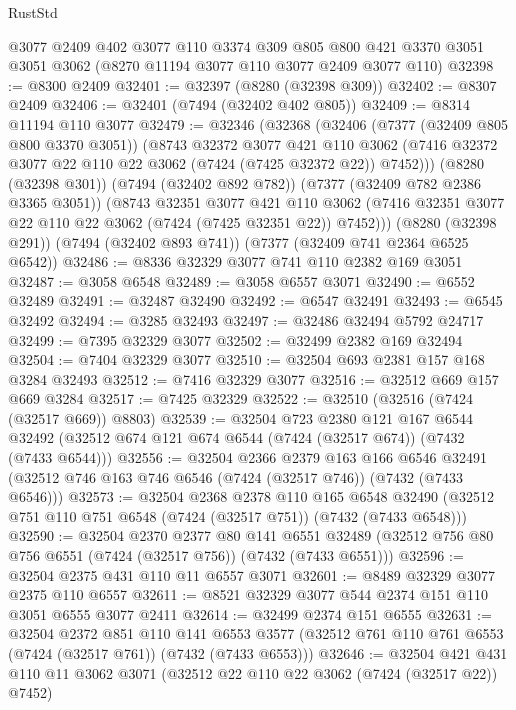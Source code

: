 \begin{lexlean}{RustStd}
\begin{coremodule}
    @3077
    @2409
    @402
    @3077
    @110
    @3374
    @309
    @805
    @800
    @421
    @3370
    @3051
    @3051
    @3062
    (@8270 @11194 @3077 @110 @3077 @2409 @3077 @110)
@32398 := @8300 @2409
@32401 := @32397 (@8280 (@32398 @309))
@32402 := @8307 @2409
@32406 := @32401 (@7494 (@32402 @402 @805))
@32409 := @8314 @11194 @110 @3077
@32479 := @32346
    (@32368
      (@32406
        (@7377 (@32409 @805 @800 @3370 @3051))
        (@8743
          @32372
          @3077
          @421
          @110
          @3062
          (@7416 @32372 @3077 @22 @110 @22 @3062 (@7424 (@7425 @32372 @22)) @7452)))
      (@8280 (@32398 @301))
      (@7494 (@32402 @892 @782))
      (@7377 (@32409 @782 @2386 @3365 @3051))
      (@8743
        @32351
        @3077
        @421
        @110
        @3062
        (@7416 @32351 @3077 @22 @110 @22 @3062 (@7424 (@7425 @32351 @22)) @7452)))
    (@8280 (@32398 @291))
    (@7494 (@32402 @893 @741))
    (@7377 (@32409 @741 @2364 @6525 @6542))
@32486 := @8336 @32329 @3077 @741 @110 @2382 @169 @3051
@32487 := @3058 @6548
@32489 := @3058 @6557 @3071
@32490 := @6552 @32489
@32491 := @32487 @32490
@32492 := @6547 @32491
@32493 := @6545 @32492
@32494 := @3285 @32493
@32497 := @32486 @32494 @5792 @24717
@32499 := @7395 @32329 @3077
@32502 := @32499 @2382 @169 @32494
@32504 := @7404 @32329 @3077
@32510 := @32504 @693 @2381 @157 @168 @3284 @32493
@32512 := @7416 @32329 @3077
@32516 := @32512 @669 @157 @669 @3284
@32517 := @7425 @32329
@32522 := @32510 (@32516 (@7424 (@32517 @669)) @8803)
@32539 := @32504
    @723
    @2380
    @121
    @167
    @6544
    @32492
    (@32512 @674 @121 @674 @6544 (@7424 (@32517 @674)) (@7432 (@7433 @6544)))
@32556 := @32504
    @2366
    @2379
    @163
    @166
    @6546
    @32491
    (@32512 @746 @163 @746 @6546 (@7424 (@32517 @746)) (@7432 (@7433 @6546)))
@32573 := @32504
    @2368
    @2378
    @110
    @165
    @6548
    @32490
    (@32512 @751 @110 @751 @6548 (@7424 (@32517 @751)) (@7432 (@7433 @6548)))
@32590 := @32504
    @2370
    @2377
    @80
    @141
    @6551
    @32489
    (@32512 @756 @80 @756 @6551 (@7424 (@32517 @756)) (@7432 (@7433 @6551)))
@32596 := @32504 @2375 @431 @110 @11 @6557 @3071
@32601 := @8489 @32329 @3077 @2375 @110 @6557
@32611 := @8521 @32329 @3077 @544 @2374 @151 @110 @3051 @6555 @3077 @2411
@32614 := @32499 @2374 @151 @6555
@32631 := @32504
    @2372
    @851
    @110
    @141
    @6553
    @3577
    (@32512 @761 @110 @761 @6553 (@7424 (@32517 @761)) (@7432 (@7433 @6553)))
@32646 := @32504
    @421
    @431
    @110
    @11
    @3062
    @3071
    (@32512 @22 @110 @22 @3062 (@7424 (@32517 @22)) @7452)

\end{coremodule}
\end{lexlean}
